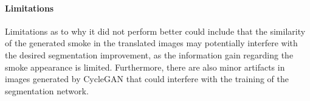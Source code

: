 \paragraph{Limitations} Limitations as to why it did not perform better could include that the similarity of the generated smoke in the translated images may potentially interfere with the desired segmentation improvement, as the information gain regarding the smoke appearance is limited.
Furthermore, there are also minor artifacts in images generated by CycleGAN that could interfere with the training of the segmentation network.


